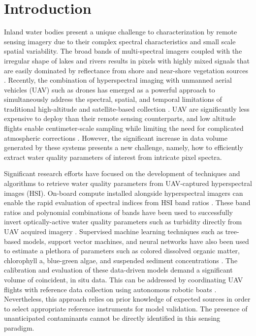 \documentclass{article}
\begin{document}
\section{Introduction}

Inland water bodies present a unique challenge to characterization by remote sensing imagery due to their complex spectral characteristics and small scale spatial variability. The broad bands of multi-spectral imagers coupled with the irregular shape of lakes and rivers results in pixels with highly mixed signals that are easily dominated by reflectance from shore and near-shore vegetation sources \cite{koponen2002lake, ritchie2003remote}. Recently, the combination of hyperspectral imaging with unmanned aerial vehicles (UAV) such as drones has emerged as a powerful approach to simultaneously address the spectral, spatial, and temporal limitations of traditional high-altitude and satellite-based collection \cite{adao2017hyperspectral,arroyo2019implementation}. UAV are significantly less expensive to deploy than their remote sensing counterparts, and low altitude flights enable centimeter-scale sampling while limiting the need for complicated atmospheric corrections \cite{banerjee2020uav}. However, the significant increase in data volume generated by these systems presents a new challenge, namely, how to efficiently extract water quality parameters of interest from intricate pixel spectra.

Significant research efforts have focused on the development of techniques and algorithms to retrieve water quality parameters from UAV-captured hyperspectral images (HSI). On-board compute installed alongside hyperspectral imagers can enable the rapid evaluation of spectral indices from HSI band ratios \cite{horstrand2019uav}. These band ratios and polynomial combinations of bands have been used to successfully invert optically-active water quality parameters such as turbidity directly from UAV acquired imagery \cite{vogt2016near, zhang2022selection}. Supervised machine learning techniques such as tree-based models, support vector machines, and neural networks have also been used to estimate a plethora of parameters such as colored dissolved organic matter, chlorophyll a, blue-green algae, and suspended sediment concentrations \cite{keller2018hyperspectral, lu2021retrieval}. The calibration and evaluation of these data-driven models demand a significant volume of coincident, in situ data. This can be addressed by coordinating UAV flights with reference data collection using autonomous robotic boats \cite{robot-team-1, robot-team-2}. Nevertheless, this approach relies on prior knowledge of expected sources in order to select appropriate reference instruments for model validation. The presence of unanticipated contaminants cannot be directly identified in this sensing paradigm. 
\end{document}
